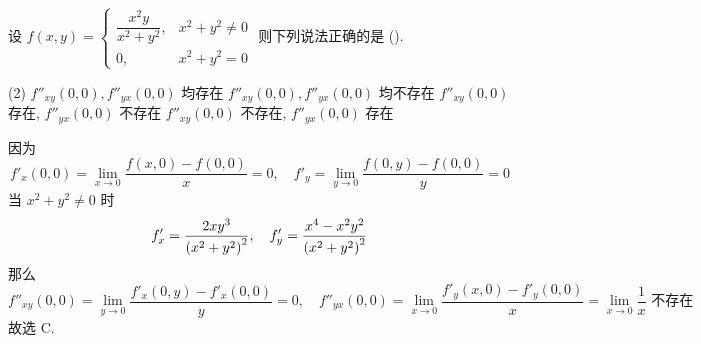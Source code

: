 \begin{example}
    设 $f(x,y)=\begin{cases}
            \dfrac{x^2y}{x^2+y^2}, & x^2+y^2\neq 0 \\
            0,                     & x^2+y^2=0
        \end{cases}$ 则下列说法正确的是  (\quad).
    \begin{tasks}(2)
        \task $f''_{xy}(0,0), f''_{yx}(0,0)$ 均存在
        \task $f''_{xy}(0,0), f''_{yx}(0,0)$ 均不存在
        \task $f''_{xy}(0,0)$ 存在, $ f''_{yx}(0,0)$ 不存在
        \task $f''_{xy}(0,0)$ 不存在, $ f''_{yx}(0,0)$ 存在
    \end{tasks}
\end{example}
\begin{solution}
    因为 $$
        f'_x(0,0)=\lim_{x \to 0}\dfrac{f(x,0)-f(0,0)}{x}=0,\quad f'_y=\lim_{y \to 0}\dfrac{f(0,y)-f(0,0)}{y}=0
    $$
    当 $x^2+y^2\neq 0$ 时
    $$
        f'_x=\dfrac{2xy^3}{\qty(x^2+y^2)^2},\quad f'_y=\dfrac{x^4-x^2y^2}{\qty(x^2+y^2)^2}
    $$
    那么 $$
        f''_{xy}(0,0)=\lim_{y \to 0}\dfrac{f'_x(0,y)-f'_x(0,0)}{y}=0,\quad f''_{yx}(0,0)=\lim_{x \to 0}\dfrac{f'_y(x,0)-f'_y(0,0)}{x}=\lim_{x \to 0}\dfrac{1}{x}\text{ 不存在}
    $$
    故选 C.
\end{solution}

